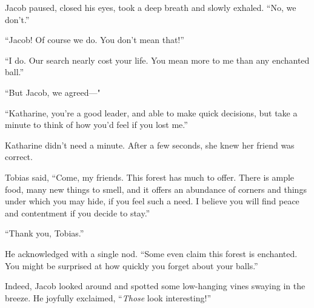 Jacob paused, closed his eyes, took a deep breath and slowly exhaled. “No, we don't.”

“Jacob! Of course we do. You don't mean that!”

“I do. Our search nearly cost your life. You mean more to me than any enchanted ball.”

“But Jacob, we agreed—"

“Katharine, you're a good leader, and able to make quick decisions, but take a minute to think of how you'd feel if you lost me.”

Katharine didn't need a minute. After a few seconds, she knew her friend was correct.

Tobias said, “Come, my friends. This forest has much to offer. There is ample food, many new things to smell, and it offers an abundance of corners and things under which you may hide, if you feel such a need. I believe you will find peace and contentment if you decide to stay.”

“Thank you, Tobias.”

He acknowledged with a single nod. “Some even claim this forest is enchanted. You might be surprised at how quickly you forget about your balls.”

Indeed, Jacob looked around and spotted some low-hanging vines swaying in the breeze. He joyfully exclaimed, “\textit{Those} look interesting!”